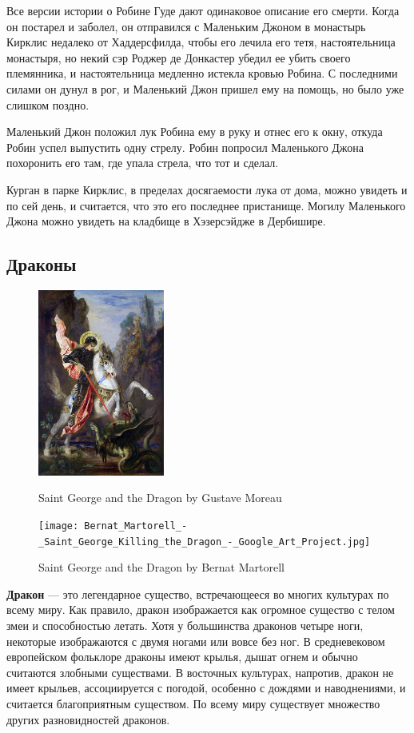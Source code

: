 Все версии истории о Робине Гуде дают одинаковое описание его
смерти. Когда он постарел и заболел, он отправился с Маленьким
Джоном в монастырь Кирклис недалеко от Хаддерсфилда, чтобы его
лечила его тетя, настоятельница монастыря, но некий сэр Роджер
де Донкастер убедил ее убить своего племянника, и настоятельница
медленно истекла кровью Робина. С последними силами он дунул в
рог, и Маленький Джон пришел ему на помощь, но было уже слишком поздно.

Маленький Джон положил лук Робина ему в руку и отнес его к окну,
откуда Робин успел выпустить одну стрелу. Робин попросил Маленького
Джона похоронить его там, где упала стрела, что тот и сделал.

Курган в парке Кирклис, в пределах досягаемости лука от дома, можно
увидеть и по сей день, и считается, что это его последнее пристанище.
Могилу Маленького Джона можно увидеть на кладбище в Хэзерсэйдже в
Дербишире.

\newpage



\newpage

\subsection*{Драконы}

\begin{figure}
    \centering
    \includegraphics[width=0.37\textwidth]{Saint-George-and-the-Dragon.jpg}
    \caption{Saint George and the Dragon by Gustave Moreau}
    \texttt{[image: Bernat\_Martorell\_-\_Saint\_George\_Killing\_the\_Dragon\_-\_Google\_Art\_Project.jpg]}
    \caption{Saint George and the Dragon by Bernat Martorell}
\end{figure}

\textbf{Дракон} — это легендарное существо, встречающееся во многих
культурах по всему миру. Как правило, дракон изображается как
огромное существо с телом змеи и способностью летать. Хотя у
большинства драконов четыре ноги, некоторые изображаются с двумя
ногами или вовсе без ног. В средневековом европейском фольклоре
драконы имеют крылья, дышат огнем и обычно считаются злобными
существами. В восточных культурах, напротив, дракон не имеет
крыльев, ассоциируется с погодой, особенно с дождями и наводнениями,
и считается благоприятным существом. По всему миру существует
множество других разновидностей драконов.

